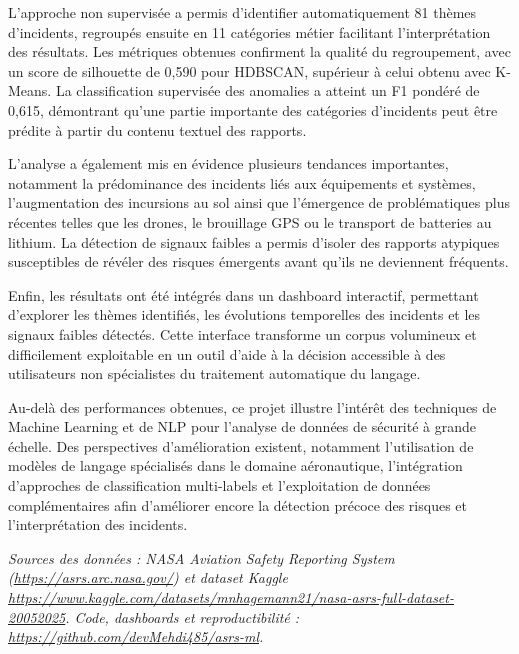 \documentclass[11pt,a4paper]{article}
\begin{document}
L'approche non supervisée a permis d'identifier automatiquement 81 thèmes d'incidents,
regroupés ensuite en 11 catégories métier facilitant l'interprétation des résultats. Les
métriques obtenues confirment la qualité du regroupement, avec un score de silhouette de
0,590 pour HDBSCAN, supérieur à celui obtenu avec K-Means. La classification supervisée des
anomalies a atteint un F1 pondéré de 0,615, démontrant qu'une partie importante des
catégories d'incidents peut être prédite à partir du contenu textuel des rapports.

L'analyse a également mis en évidence plusieurs tendances importantes, notamment la
prédominance des incidents liés aux équipements et systèmes, l'augmentation des incursions au
sol ainsi que l'émergence de problématiques plus récentes telles que les drones, le brouillage
GPS ou le transport de batteries au lithium. La détection de signaux faibles a permis d'isoler
des rapports atypiques susceptibles de révéler des risques émergents avant qu'ils ne
deviennent fréquents.

Enfin, les résultats ont été intégrés dans un dashboard interactif, permettant d'explorer les
thèmes identifiés, les évolutions temporelles des incidents et les signaux faibles détectés.
Cette interface transforme un corpus volumineux et difficilement exploitable en un outil
d'aide à la décision accessible à des utilisateurs non spécialistes du traitement automatique
du langage.

Au-delà des performances obtenues, ce projet illustre l'intérêt des techniques de Machine
Learning et de NLP pour l'analyse de données de sécurité à grande échelle. Des perspectives
d'amélioration existent, notamment l'utilisation de modèles de langage spécialisés dans le
domaine aéronautique, l'intégration d'approches de classification multi-labels et
l'exploitation de données complémentaires afin d'améliorer encore la détection précoce des
risques et l'interprétation des incidents.

\vfill
\noindent\footnotesize\textit{Sources des données : NASA Aviation Safety Reporting System
(\url{https://asrs.arc.nasa.gov/}) et dataset Kaggle
\url{https://www.kaggle.com/datasets/mnhagemann21/nasa-asrs-full-dataset-20052025}. Code,
dashboards et reproductibilité : \url{https://github.com/devMehdi485/asrs-ml}.}
\end{document}
